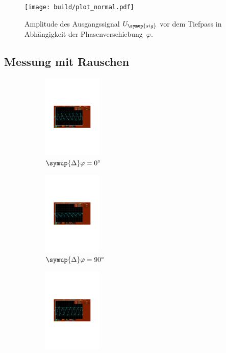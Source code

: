 \begin{figure}
  \centering
  \texttt{[image: build/plot\_normal.pdf]}
  \caption{Amplitude des Ausgangssignal $U_{\symup{sig}}$ vor dem Tiefpass in Abhängigkeit der Phasenverschiebung~$\varphi$.}
  \label{fig:plot normal}
\end{figure}

\subsection{Messung mit Rauschen}
\label{sec:mit rauschen}

\begin{figure}
  \begin{subfigure}{0.48\textwidth}
    \centering
    \includegraphics[height=4cm]{content/Bilder/verrauscht/0.pdf}
    \caption{$\symup{\Delta}\varphi = \qty{0}{\degree}$}
  \end{subfigure}
  \begin{subfigure}{0.48\textwidth}
    \centering
    \includegraphics[height=4cm]{content/Bilder/verrauscht/90.pdf}
    \caption{$\symup{\Delta}\varphi = \qty{90}{\degree}$}
  \end{subfigure}
  \begin{subfigure}{0.48\textwidth}
    \centering
    \includegraphics[height=4cm]{content/Bilder/verrauscht/180.pdf}

\end{subfigure}
\end{figure}
